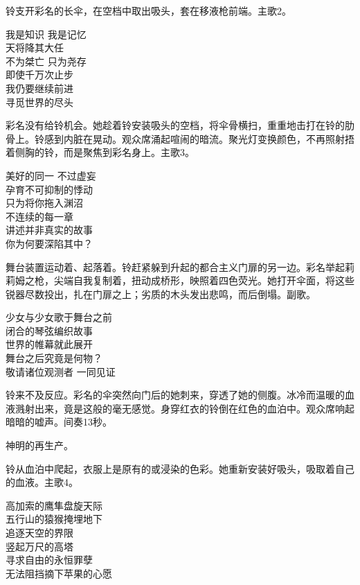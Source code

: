 铃支开彩名的长伞，在空档中取出吸头，套在移液枪前端。主歌2。
\begin{song}
我是知识 我是记忆\\
天将降其大任\\
不为桀亡 只为尧存\\
即使千万次止步\\
我仍要继续前进\\
寻觅世界的尽头
\end{song}

彩名没有给铃机会。她趁着铃安装吸头的空档，将伞骨横扫，重重地击打在铃的肋骨上。铃感到内脏在晃动。观众席涌起喧闹的暗流。聚光灯变换颜色，不再照射捂着侧胸的铃，而是聚焦到彩名身上。主歌3。
\begin{song}
美好的同一 不过虚妄\\
孕育不可抑制的悸动\\
只为将你拖入渊沼\\
不连续的每一章\\
讲述并非真实的故事\\
你为何要深陷其中？
\end{song}

舞台装置运动着、起落着。铃赶紧躲到升起的都合主义门扉的另一边。彩名举起莉莉姆之枪，尖端自我复制着，扭动成桥形，映照着四色荧光。她打开伞面，将这些锐器尽数投出，扎在门扉之上；劣质的木头发出悲鸣，而后倒塌。副歌。
\begin{song}
少女与少女歌于舞台之前\\
闭合的琴弦编织故事\\
世界的帷幕就此展开\\
舞台之后究竟是何物？\\
敬请诸位观测者 一同见证
\end{song}

铃来不及反应。彩名的伞突然向门后的她刺来，穿透了她的侧腹。冰冷而温暖的血液溅射出来，竟是这般的毫无感觉。身穿红衣的铃倒在红色的血泊中。观众席响起暗暗的嘘声。间奏13秒。
\begin{song}
神明的再生产。
\end{song}

铃从血泊中爬起，衣服上是原有的或浸染的色彩。她重新安装好吸头，吸取着自己的血液。主歌4。
\begin{song}
高加索的鹰隼盘旋天际\\
五行山的猿猴掩埋地下\\
追逐天空的界限\\
竖起万尺的高塔\\
寻求自由的永恒罪孽\\
无法阻挡摘下苹果的心愿
\end{song}

